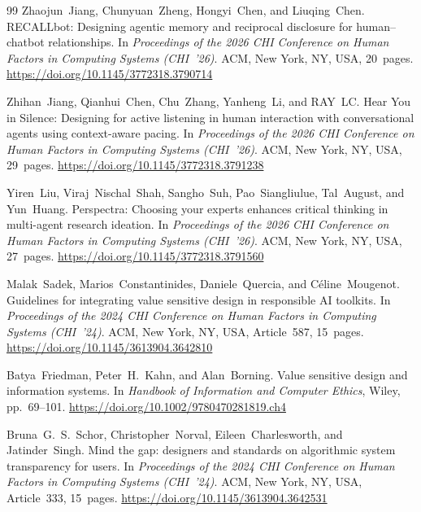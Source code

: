 \documentclass[sigconf,screen]{acmart}
\begin{document}
\begin{thebibliography}{99}
Zhaojun~Jiang, Chunyuan~Zheng, Hongyi~Chen, and Liuqing~Chen.
\newblock RECALLbot: Designing agentic memory and reciprocal disclosure for
human--chatbot relationships.
\newblock In \emph{Proceedings of the 2026 CHI Conference on Human Factors in
Computing Systems (CHI~'26)}. ACM, New York, NY, USA, 20~pages.
\newblock \url{https://doi.org/10.1145/3772318.3790714}

Zhihan~Jiang, Qianhui~Chen, Chu~Zhang, Yanheng~Li, and RAY~LC.
\newblock Hear You in Silence: Designing for active listening in human interaction
with conversational agents using context-aware pacing.
\newblock In \emph{Proceedings of the 2026 CHI Conference on Human Factors in
Computing Systems (CHI~'26)}. ACM, New York, NY, USA, 29~pages.
\newblock \url{https://doi.org/10.1145/3772318.3791238}

Yiren~Liu, Viraj~Nischal~Shah, Sangho~Suh, Pao~Siangliulue, Tal~August, and
Yun~Huang.
\newblock Perspectra: Choosing your experts enhances critical thinking in multi-agent
research ideation.
\newblock In \emph{Proceedings of the 2026 CHI Conference on Human Factors in
Computing Systems (CHI~'26)}. ACM, New York, NY, USA, 27~pages.
\newblock \url{https://doi.org/10.1145/3772318.3791560}

Malak~Sadek, Marios~Constantinides, Daniele~Quercia, and C\'{e}line~Mougenot.
\newblock Guidelines for integrating value sensitive design in responsible AI
toolkits.
\newblock In \emph{Proceedings of the 2024 CHI Conference on Human Factors in
Computing Systems (CHI~'24)}. ACM, New York, NY, USA, Article~587, 15~pages.
\newblock \url{https://doi.org/10.1145/3613904.3642810}

Batya~Friedman, Peter~H.~Kahn, and Alan~Borning.
\newblock Value sensitive design and information systems.
\newblock In \emph{Handbook of Information and Computer Ethics}, Wiley,
pp.~69--101.
\newblock \url{https://doi.org/10.1002/9780470281819.ch4}

Bruna~G.~S.~Schor, Christopher~Norval, Eileen~Charlesworth, and Jatinder~Singh.
\newblock Mind the gap: designers and standards on algorithmic system transparency
for users.
\newblock In \emph{Proceedings of the 2024 CHI Conference on Human Factors in
Computing Systems (CHI~'24)}. ACM, New York, NY, USA, Article~333, 15~pages.
\newblock \url{https://doi.org/10.1145/3613904.3642531}


\end{thebibliography}
\end{document}
